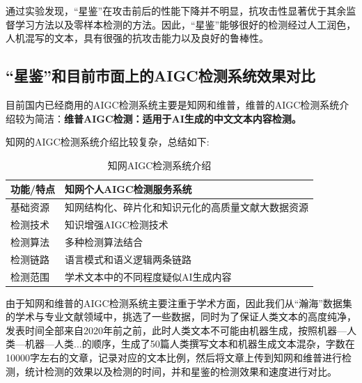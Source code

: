 \documentclass[a4paper]{report}
\begin{document}
通过实验发现，“星鉴”在攻击前后的性能下降并不明显，抗攻击性显著优于其余监督学习方法以及零样本检测的方法。因此，“星鉴”能够很好的检测经过人工润色，人机混写的文本，具有很强的抗攻击能力以及良好的鲁棒性。


\subsection{“星鉴”和目前市面上的AIGC检测系统效果对比}
目前国内已经商用的AIGC检测系统主要是知网和维普，维普的AIGC检测系统介绍较为简洁：\textbf{维普AIGC检测：适用于AI生成的中文文本内容检测。}

知网的AIGC检测系统介绍比较复杂，总结如下:
\begin{table}[H]
	\centering
	\begin{tabular}{|>{\raggedright\arraybackslash}p{3cm}|>{\raggedright\arraybackslash}p{10cm}|}
		\hline
		\textbf{功能/特点} & \textbf{知网个人AIGC检测服务系统}   \\ \hline
		基础资源           & 知网结构化、碎片化和知识元化的高质量文献大数据资源 \\ \hline
		检测技术           & 知识增强AIGC检测技术              \\ \hline
		检测算法           & 多种检测算法结合                  \\ \hline
		检测链路           & 语言模式和语义逻辑两条链路             \\ \hline
		检测范围           & 学术文本中的不同程度疑似AI生成内容        \\ \hline
	\end{tabular}
	\caption{知网AIGC检测系统介绍}
\end{table}
由于知网和维普的AIGC检测系统主要注重于学术方面，因此我们从“瀚海”数据集的学术与专业文献领域中，挑选了一些数据，同时为了保证人类文本的高度纯净，发表时间全部来自2020年前之前，此时人类文本不可能由机器生成，按照机器---人类---机器---人类$\ldots$的顺序，生成了50篇人类撰写文本和机器生成文本混杂，字数在10000字左右的文章，记录对应的文本比例，然后将文章上传到知网和维普进行检测，统计检测的效果以及检测的时间，并和星鉴的检测效果和速度进行对比。
\end{document}
